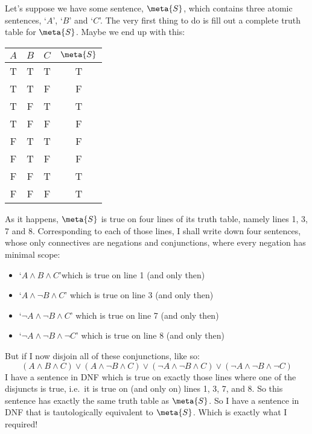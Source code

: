 Let's suppose we have some sentence, $\meta{S}$, which contains three atomic sentences, `$A$', `$B$' and `$C$'. The very first thing to do is fill out a complete truth table for $\meta{S}$. Maybe we end up with this:
\begin{center}
\begin{tabular}{c c c | c}
$A$ & $B$ & $C$ & $\meta{S}$\\
\hline
 T & T & T & T \\
 T & T & F & F \\
 T & F & T & T \\
 T & F & F & F \\
 F & T & T & F \\
 F & T & F & F \\
 F & F & T & T \\
 F & F & F & T
\end{tabular}
\end{center}
%
%
As it happens, $\meta{S}$ is true on four lines of its truth table, namely lines 1, 3, 7 and 8. Corresponding to each of those lines, I shall write down four sentences, whose only connectives are negations and conjunctions, where every negation has minimal scope:
	\begin{itemize}
		\item[\textbullet]  `$A \land B \land C$'\hfill which is true on line 1 (and only then)
		\item[\textbullet] `$A \land \lnot B \land C$' \hfill which is true on line 3 (and only then)
		\item[\textbullet] `$\lnot A \land \lnot B \land C$' \hfill which is true on line 7 (and only then)
		\item[\textbullet] `$\lnot A \land \lnot B \land \lnot C$' \hfill which is true on line 8 (and only then)
	\end{itemize}
But if I now disjoin all of these conjunctions, like so:
$$(A \land B \land C) \lor (A \land \lnot B \land C) \lor (\lnot A \land \lnot B \land C) \lor (\lnot A \land \lnot B \land \lnot C)$$
I have a sentence in DNF which is true on exactly those lines where one of the disjuncts is true, i.e.\ it is true on (and only on) lines 1, 3, 7, and 8. So this sentence has exactly the same truth table as $\meta{S}$. So I have a sentence in DNF that is tautologically equivalent to $\meta{S}$. Which is exactly what I required!

